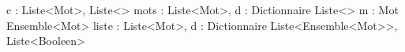 \begin{algorithme}
		{c : \caractere}%
		{Liste<Mot>, Liste<\naturel>}
		{mots : Liste<Mot>, d : Dictionnaire}%
		{Liste<\booleen>}
		{m : Mot}%
		{Ensemble<Mot>}%
		{liste : Liste<Mot>, d : Dictionnaire}%
		{Liste<Ensemble<Mot>>, Liste<Booleen>}%
\end{algorithme}
